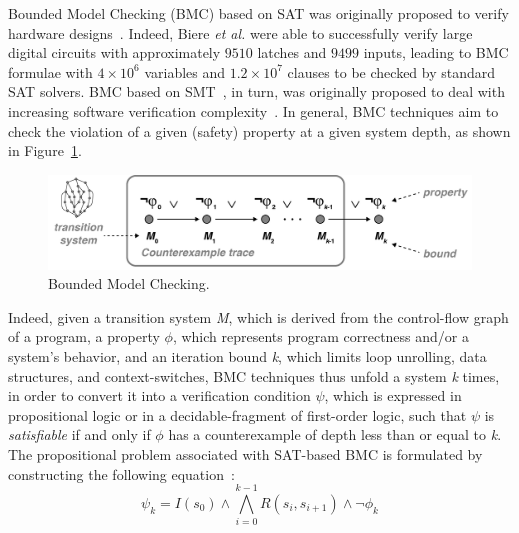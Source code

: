 \documentclass[format=acmsmall, review=false, screen=true]{acmart}
\begin{document}
Bounded Model Checking (BMC) based on SAT was originally proposed to verify hardware designs~\cite{Biere99,handbook09}. Indeed, Biere {\it et al.} were able to successfully verify large digital circuits with approximately $9510$ latches and $9499$ inputs, leading to BMC formulae with $4 \times 10^6$ variables and $1.2 \times 10^7$ clauses to be checked by standard SAT solvers. BMC based on SMT~\cite{BarrettSST09}, in turn, was originally proposed to deal with increasing software verification complexity~\cite{Armando2009}. 
%
In general, BMC techniques aim to check the violation of a given (safety) property at a given system depth, as shown in Figure~\ref{bounded-model-checking}. 
%
\begin{figure}[h]
	\centering
	\includegraphics[width=\textwidth]{figure2.jpg}
	\caption{Bounded Model Checking.}
	\label{bounded-model-checking}
\end{figure}

Indeed, given a transition system \textit{M}, which is derived from the control-flow graph of a program, a property $\phi$, which represents program correctness and/or a system's behavior, and an iteration bound \textit{k}, which limits loop unrolling, data structures, and context-switches, BMC techniques thus unfold a system \textit{k} times, in order to convert it into a verification condition $\psi$, which is expressed in propositional logic or in a decidable-fragment of first-order logic, such that $\psi$ is \textit{satisfiable} if and only if $\phi$ has a counterexample of depth less than or equal to \textit{k}. The propositional problem associated with SAT-based BMC is formulated by constructing the following equation~\cite{Biere99}:
%
\begin{equation}
\label{bounded-model-checking-biere}
\psi_{k} = I\left(s_{0}\right) \wedge \bigwedge^{k-1}_{i=0} R\left(s_{i},s_{i+1}\right) \wedge \neg \phi_{k}
\end{equation}
\end{document}
